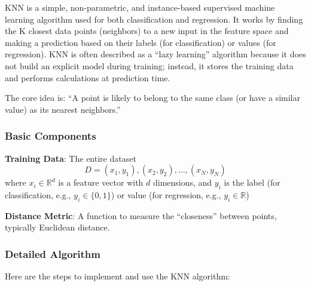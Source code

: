 KNN is a simple, non-parametric, and instance-based supervised machine learning algorithm used for both classification and regression.
It works by finding the K closest data points (neighbors) to a new input in the feature space and making a prediction based on their labels (for classification) or values (for regression).
KNN is often described as a ``lazy learning'' algorithm because it does not build an explicit model during training; instead, it stores the training data and performs calculations at prediction time.

The core idea is: ``A point is likely to belong to the same class (or have a similar value) as its nearest neighbors.''

\subsubsection{Basic Components}\text{}

\smallskip
\textbf{Training Data}: The entire dataset
    \[D = {(x_1, y_1), (x_2, y_2), \ldots, (x_N, y_N)}\]
    where $x_i \in \mathbb{R}^d$ is a feature vector with $d$ dimensions, and $y_i$ is the label (for classification, e.g., $y_i \in \{0,1\}$) or value (for regression, e.g., $y_i \in \mathbb{R}$)

\textbf{Distance Metric}: A function to measure the ``closeness'' between points, typically Euclidean distance.

\smallskip
\subsubsection{Detailed Algorithm}\text{}

Here are the steps to implement and use the KNN algorithm:

